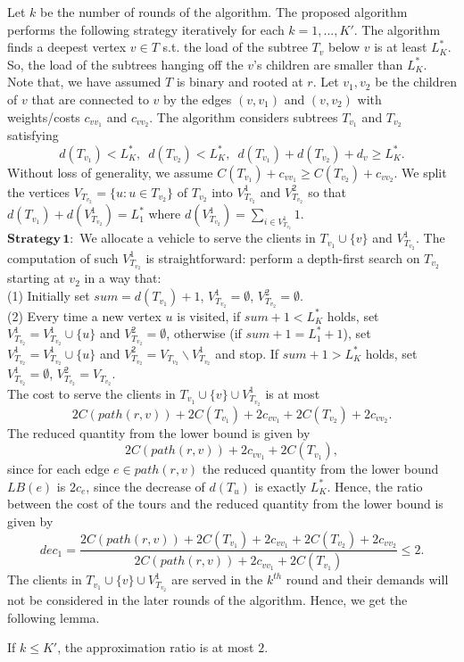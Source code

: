 \indent Let $k$ be the number of rounds of the algorithm. The proposed algorithm performs the following strategy iteratively for each $k=1,...,K'$. The algorithm finds a deepest vertex $v \in T$ s.t. the load of the subtree $T_{v}$ below $v$ is at least $L_K^*$. So, the load of the subtrees hanging off the $v$'s children are smaller than $L^*_K$. Note that, we have assumed $T$ is binary and rooted at $r$. Let $v_1, v_2$ be the children of $v$ that are connected to $v$ by the edges $(v,v_1)$ and $(v,v_2)$ with weights/costs $c_{vv_1}$ and $c_{vv_2}$. The algorithm considers subtrees $T_{v_1}$ and $T_{v_2}$ satisfying 
$$d(T_{v_1}) < L^*_K,\,\,\,d(T_{v_2}) < L^*_K,\,\,\,d(T_{v_1})+d(T_{v_2})+d_{v} \ge L^*_K.$$
\noindent Without loss of generality, we assume $C(T_{v_1})+c_{vv_1} \ge C(T_{v_2}) + c_{vv_2} $. We split the vertices $V_{T_{v_2}}=\{u: u\in T_{v_2}\}$ of $T_{v_2}$ into $V^1_{T_{v_2}}$ and $V^2_{T_{v_2}}$ so that $d(T_{v_1})+d(V^1_{T_{v_2}})=L^*_1$ where $d(V^1_{T_{v_2}})=\sum_{i\in V^1_{T_{v_2}}} 1$.\\
\indent $\mathbf{Strategy \, 1}:$ We allocate a vehicle to serve the clients in $T_{v_1} \cup \{v\}$ and $V^1_{T_{v_2}}$. The computation of such $V^1_{T_{v_2}}$ is straightforward: perform a depth-first search on $T_{v_2}$ starting at $v_2$ in a way that:\\
\noindent (1) Initially set $sum=d(T_{v_1})+1$, $V^1_{T_{v_2}}=\emptyset$, $V^2_{T_{v_2}}=\emptyset$.\\
\noindent (2) Every time a new vertex $u$ is visited, if $sum+1<L^*_K$ holds, set $V^1_{T_{v_2}}=V^1_{T_{v_2}}\cup \{u\}$ and $V^2_{T_{v_2}}=\emptyset$, otherwise (if $sum+1=L^*_1+1$), set $V^1_{T_{v_2}}=V^1_{T_{v_2}} \cup{\{u\}}$ and $V^2_{T_{v_2}}=V_{T_{v_2}} \backslash V^1_{T_{v_2}}$ and stop. If $sum+1>L^*_K$ holds, set $V^1_{T_{v_2}}=\emptyset$, $V^2_{T_{v_2}}=V_{T_{v_2}}$.\\
\indent The cost to serve the clients in $T_{v_1} \cup \{v\} \cup V^1_{T_{v_2}}$ is at most
$$2C(path(r,v)) + 2C(T_{v_1}) + 2c_{vv_1} + 2C(T_{v_2}) + 2c_{vv_2}. $$
\noindent The reduced quantity from the lower bound is given by
$$2C(path(r,v)) + 2c_{vv_1} + 2C(T_{v_1}),$$
\noindent since for each edge $e \in path(r,v)$ the reduced quantity from the lower bound $LB(e)$ is $2c_e$, since the decrease of $d(T_u)$ is exactly $L_K^*$. Hence, the ratio between the cost of the tours and the reduced quantity from the lower bound is given by
$$dec_1=\frac{2C(path(r,v)) + 2C(T_{v_1}) +2c_{vv_1} + 2C(T_{v_2})+ 2c_{vv_2} }{2C(path(r,v)) +2c_{vv_1} + 2C(T_{v_1})} \le 2.$$
\noindent The clients in $T_{v_1} \cup \{v\} \cup V^1_{T_{v_2}}$ are served in the $k^{th}$ round and their demands will not be considered in the later rounds of the algorithm. Hence, we get the following lemma.
 \begin{lemma}
If $k \le K'$, the approximation ratio is at most $2$.
\end{lemma}


